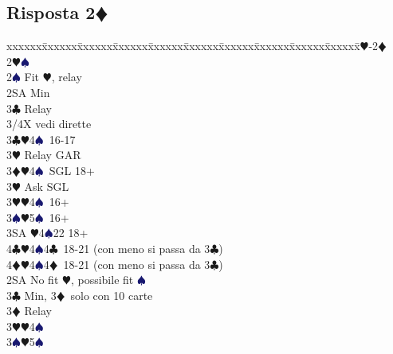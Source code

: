 \documentclass[a4paper,italian]{article}
\newcommand{\BC}{\textcolor{OliveGreen}{$\clubsuit$}}
\newcommand{\BD}{\textcolor{RedOrange}{$\vardiamondsuit$}}
\newcommand{\BH}{\textcolor{Red2}{$\varheartsuit${}}}
\newcommand{\BS}{\textcolor{MidnightBlue}{$\spadesuit${}}}
\newcommand{\pdfd}{\texorpdfstring{\BD{}}{D}}
\newenvironment{bidtable}
{\begin{tabbing}

    xxxxxx\=xxxxxx\=xxxxxx\=xxxxxx\=xxxxxx\=xxxxxx\=xxxxxx\=xxxxxx\=xxxxxx\=xxxxxx\=\kill}
{\end{tabbing} }%
\begin{document}
                                    \subsection{Risposta 2\pdfd}
                                    \begin{multicols}{2}
                                        \begin{bidtable}
                                            1\BH-2\BD\\
                                            2\BH {}\BS \+\\
                                            2\BS \> Fit \BH , relay\+\\
                                            2SA \> Min\+\\
                                            3\BC \> Relay\+\\
                                            3/4X \> vedi dirette\-\-\\
                                            3\BC {}\BH 4\BS\ 16-17\+\\
                                            3\BH \> Relay GAR\-\\
                                            3\BD {}\BH 4\BS\ SGL 18+\+\\
                                            3\BH \> Ask SGL\-\\
                                            3\BH {}\BH 4\BS\ 16+\\
                                            3\BS {}\BH 5\BS\ 16+\\
                                            3SA \BH 4\BS 22 18+\\
                                            4\BC {}\BH 4\BS 4\BC\ 18-21 (con meno si passa da 3\BC )\\
                                            4\BD {}\BH 4\BS 4\BD\ 18-21 (con meno si passa da 3\BC )\-\\
                                            2SA \> No fit \BH , possibile fit \BS \+\\
                                            3\BC \> Min, 3\BD\ solo con 10 carte\+\\
                                            3\BD \> Relay\+\\
                                            3\BH {}\BH 4\BS \\
                                            3\BS {}\BH 5\BS \\

\end{bidtable}
\end{multicols}
\end{document}
